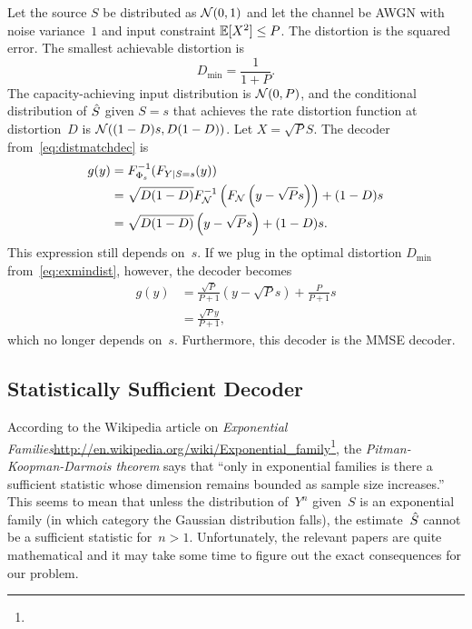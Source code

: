 \begin{example}
  Let the source $S$ be distributed as ${\mathcal{N}}(0,1)$ and let the channel be AWGN
  with noise variance~$1$ and input constraint $\mathbb{E}[X^2] \le P$.
  The distortion is the squared error. The smallest achievable distortion is
  \begin{equation}
    \label{eq:exmindist}
    D_{\min} = \frac{1}{1 + P}.
  \end{equation}
  The capacity-achieving input distribution is ${\mathcal{N}}(0,P)$, and the conditional
  distribution of ${\hat{S}}$ given $S=s$ that achieves the rate distortion function
  at distortion~$D$ is ${\mathcal{N}}((1-D)s, D(1-D))$.
  Let $X = \sqrt{P}S$.  The decoder from~\eqref{eq:distmatchdec} is
  \begin{align*}
    g(y) &= F_{\Phi_s}^{-1} (F_{Y|S=s}(y)) \\
    &= \sqrt{D(1-D)} F_{{\mathcal{N}}}^{-1} \left( F_{{\mathcal{N}}}\left( y-\sqrt{P}s
    \right) \right) + (1-D)s \\
    &= \sqrt{D(1-D)} \left( y-\sqrt{P}s \right) + (1-D)s.
  \end{align*}
  This expression still depends on~$s$. If we plug in the optimal distortion
  $D_{\min}$ from~\eqref{eq:exmindist}, however, the decoder becomes
  \begin{align*}
    g(y) &= \frac{\sqrt{P}}{P+1} (y - \sqrt{P}s) + \frac{P}{P +
    1}s \\ 
    &= \frac{\sqrt{P}y}{P + 1},
  \end{align*}
  which no longer depends on~$s$. Furthermore, this decoder is the MMSE decoder.
\end{example}

\subsection{Statistically Sufficient Decoder}

\begin{notebox}
According to the Wikipedia article on \emph{Exponential
Families}\urldef{\wikiexp}\url{http://en.wikipedia.org/wiki/Exponential_family}\footnote{\wikiexp},
the \emph{Pitman-Koopman-Darmois theorem} says that ``only in exponential
families is there a sufficient statistic whose dimension remains bounded as
sample size increases.'' This seems to mean that unless the distribution
of~$Y^n$ given~$S$ is an exponential family (in which category the Gaussian
distribution falls), the estimate~${\hat{S}}$ cannot be a sufficient statistic for~$n
> 1$. Unfortunately, the relevant papers are quite mathematical and it may take
some time to figure out the exact consequences for our problem. 
\end{notebox}


